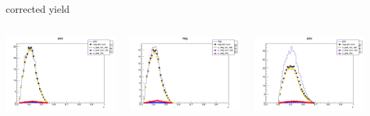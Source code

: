 \begin{frame}{corrected yield}
\begin{columns}
\begin{column}[T]{0.25\textwidth}
\includegraphics[width = \textwidth]{results/yield/statistics_corr/yield_x_Q2_z_0.50_3.979_0.40_pos.png}
\end{column}
\begin{column}[T]{0.25\textwidth}
\includegraphics[width = \textwidth]{results/yield/statistics_corr/yield_x_Q2_z_0.50_3.979_0.40_neg.png}
\end{column}
\begin{column}[T]{0.25\textwidth}
\includegraphics[width = \textwidth]{results/yield/statistics_corr/yield_x_Q2_z_0.50_3.979_0.50_pos.png}

\end{column}
\end{columns}
\end{frame}
